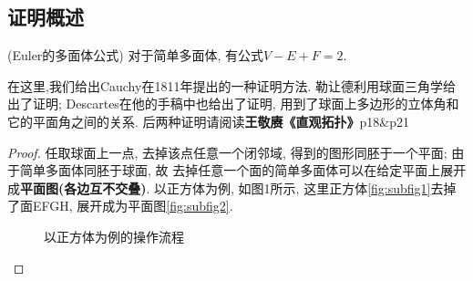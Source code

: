 \documentclass[main]{subfiles}
\begin{document}
\subsection*{证明概述}
\begin{theorem}(Euler的多面体公式)
  对于简单多面体, 有公式$V-E+F=2$.
\end{theorem}
在这里,我们给出Cauchy在1811年提出的一种证明方法. 
勒让德利用球面三角学给出了证明; Descartes在他的手稿中也给出了证明, 用到了球面上多边形的立体角和它的平面角之间的关系. 后两种证明请阅读\textbf{王敬赓《直观拓扑》}p18\&p21
\begin{proof}
  任取球面上一点, 去掉该点任意一个闭邻域, 得到的图形同胚于一个平面; 由于简单多面体同胚于球面, 故
  去掉任意一个面的简单多面体可以在给定平面上展开成\textbf{平面图(各边互不交叠)}. 以正方体为例, 如图1所示, 
  这里正方体\ref{fig:subfig1}去掉了面EFGH, 展开成为平面图\ref{fig:subfig2}.

  \begin{figure}[h]    
      \centering            
      \caption{以正方体为例的操作流程}
      \label{fig:subfig_1} 
  \end{figure}


\end{proof}
\end{document}
